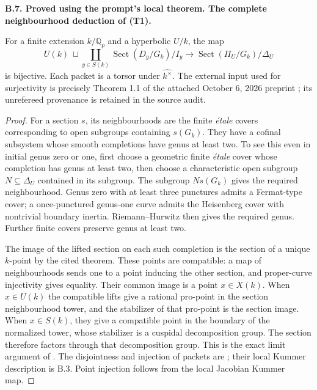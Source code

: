 \documentclass[11pt,oneside]{article}
\makeatletter
\newcounter{statementanchor}
\newenvironment{statement}[3]{%
 \refstepcounter{statementanchor}\def\@currentlabel{#1}%
 \par\addvspace{9pt}\noindent
 \textbf{#1. #2. #3.}\par\nobreak\noindent\ignorespaces
}{\par\addvspace{5pt}}
\makeatother
\begin{document}
\begin{statement}{B.7}{Proved using the prompt's local theorem}{The complete neighbourhood deduction of (T1)}
\label{st:B.7}

For a finite extension $k/\mathbb Q_p$ and a hyperbolic $U/k$, the map
\[
 U(k)\ \sqcup\!\coprod_{y\in S(k)}\operatorname{Sect}(D_y/G_k)/I_y
 \longrightarrow \operatorname{Sect}(\Pi_U/G_k)/\Delta_U
\]
is bijective.  Each packet is a torsor under $\widehat{k^\times}$.
The external input used for surjectivity is precisely Theorem 1.1 of
the attached October 6, 2026 preprint \cite{B_OpenAIPadic}; its
unrefereed provenance is retained in the source audit.
\end{statement}
\begin{proof}
For a section $s$, its neighbourhoods are the finite \emph{\'etale}
covers corresponding to open subgroups containing $s(G_k)$.
They have a cofinal subsystem whose smooth completions have genus at
least two.  To see this even in initial genus zero or one, first choose
a geometric finite \emph{\'etale} cover whose completion has genus at
least two, then choose a characteristic open subgroup $N\subseteq
\Delta_U$ contained in its subgroup.  The subgroup $N s(G_k)$ gives
the required neighbourhood.  Genus zero with at least three punctures
admits a Fermat-type cover; a once-punctured genus-one curve admits
the Heisenberg cover with nontrivial boundary inertia.  Riemann--Hurwitz
then gives the required genus.  Further finite covers preserve genus
at least two.

The image of the lifted section on each such completion is the section
of a unique $k$-point by the cited theorem.  These points are compatible:
a map of neighbourhoods sends one to a point inducing the other
section, and proper-curve injectivity gives equality.  Their common
image is a point $x\in X(k)$.  When $x\in U(k)$ the compatible lifts
give a rational pro-point in the section neighbourhood tower, and
the stabilizer of that pro-point is the section image.  When
$x\in S(k)$, they give a compatible point in the boundary of the
normalized tower, whose stabilizer is a cuspidal decomposition group.
The section therefore factors through that decomposition group.
This is the exact limit argument of
\cite[\S2.1.2]{B_StixLocal}.  The disjointness and injection of packets
are \cite[Theorem 14]{B_StixCuspidal}; their local Kummer description
is B.3.  Point injection follows from the local Jacobian Kummer map.
\end{proof}
\end{document}
